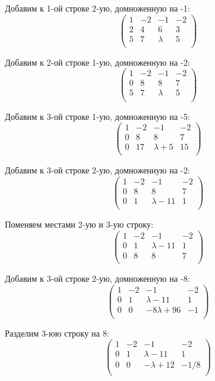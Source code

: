 	 Добавим к 1-ой строке 2-ую, домноженную на -1:
	 \[
	 \begin{pmatrix}
	 1 & -2 & -1 & -2 \\
	 2 & 4 & 6 & 3 \\
	 5 & 7 & \lambda & 5 \\
	 \end{pmatrix}
	 \]
	 
	 Добавим к 2-ой строке 1-ую, домноженную на -2:
	 \[
	 \begin{pmatrix}
	 1 & -2 & -1 & -2 \\
	 0 & 8 & 8 & 7 \\
	 5 & 7 & \lambda & 5 \\
	 \end{pmatrix}
	 \]
	 
	 Добавим к 3-ой строке 1-ую, домноженную на -5:
	 \[
	 \begin{pmatrix}
	 1 & -2 & -1 & -2 \\
	 0 & 8 & 8 & 7 \\
	 0 & 17 & \lambda + 5 & 15 \\
	 \end{pmatrix}
	 \]
	 
	 Добавим к 3-ой строке 2-ую, домноженную на -2:
	 \[
	 \begin{pmatrix}
	 1 & -2 & -1 & -2 \\
	 0 & 8 & 8 & 7 \\
	 0 & 1 & \lambda-11 & 1 \\
	 \end{pmatrix}
	 \]
	 
	 Поменяем местами 2-ую и 3-ую строку:
	 \[
	 \begin{pmatrix}
	 1 & -2 & -1 & -2 \\
	 0 & 1 & \lambda-11 & 1 \\
	 0 & 8 & 8 & 7 \\
	 \end{pmatrix}
	 \]
	 
	 Добавим к 3-ой строке 2-ую, домноженную на -8:
	 \[
	 \begin{pmatrix}
	 1 & -2 & -1 & -2 \\
	 0 & 1 & \lambda-11 & 1 \\
	 0 & 0 & -8\lambda+96 & -1 \\
	 \end{pmatrix}
	 \]
	 
	 Разделим 3-юю строку на 8:
	 \[
	 \begin{pmatrix}
	 1 & -2 & -1 & -2 \\
	 0 & 1 & \lambda-11 & 1 \\
	 0 & 0 & -\lambda+12 & -1/8 \\
	 \end{pmatrix}
	 \]
	 
